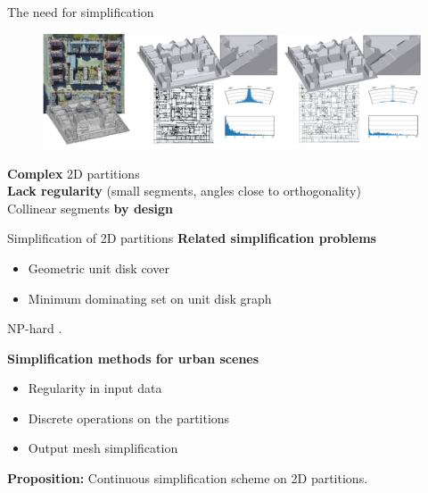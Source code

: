 \begin{frame}{The need for simplification}
	\begin{figure}
		\includegraphics[width=\linewidth]{teaser_v2}
	\end{figure}
	
	\textbf{Complex} 2D partitions\\
	\textbf{Lack regularity} (small segments, angles close to orthogonality)\\
	Collinear segments \textbf{by design}\\
		
\end{frame}

\begin{frame}{Simplification of 2D partitions}
	\small
	\textbf{Related simplification problems}
	\begin{itemize}
		\item Geometric unit disk cover
		\item Minimum dominating set on unit disk graph
	\end{itemize}
	NP-hard \cite{marathe_SimpleHeuristicsUnit_1995}.
	
	\textbf{Simplification methods for urban scenes}
	\begin{itemize}
		\item Regularity in input data \cite{zhou_5DDualContouring_2010, monszpart_RAPterRebuildingManmade_2015, zhou_FastExtensibleBuilding_2008}
		\item Discrete operations on the partitions \cite{li_ApproximatingShapesImages_2020}
		\item Output mesh simplification \cite{garland_SurfaceSimplificationUsing_1997, salinas_StructureAwareMeshDecimation_2015}
	\end{itemize}

	\textbf{Proposition:} Continuous simplification scheme on 2D partitions.
\end{frame}

